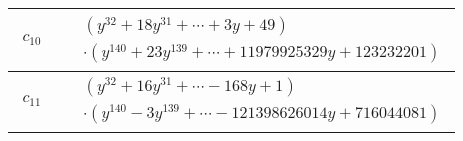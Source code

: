 \documentclass[1p]{elsarticle_modified}
\theoremstyle{definition}
\begin{document}
\begin{tabular}{m{50pt}|m{274pt}}
\hline $$\begin{aligned}c_{10}\end{aligned}$$&$\begin{aligned}
&(y^{32}+18 y^{31}+\cdots+3 y+49)\\
&\cdot(y^{140}+23 y^{139}+\cdots+11979925329 y+123232201)
\end{aligned}$\\
\hline $$\begin{aligned}c_{11}\end{aligned}$$&$\begin{aligned}
&(y^{32}+16 y^{31}+\cdots-168 y+1)\\
&\cdot(y^{140}-3 y^{139}+\cdots-121398626014 y+716044081)
\end{aligned}$\\
\hline
\end{tabular}
\vskip 2pc
\end{document}
